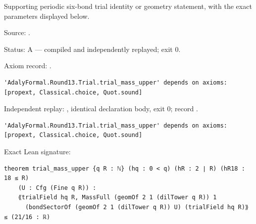\begin{theorem}[bp-372]
\label{bp-372}
\leanok
Supporting periodic six-bond trial identity or geometry statement, with the exact parameters displayed below.

\par Source: \texttt{}.
\par Status: A — compiled and independently replayed; exit 0.
\par Axiom record: \texttt{}.
\begin{verbatim}
'AdalyFormal.Round13.Trial.trial_mass_upper' depends on axioms: [propext, Classical.choice, Quot.sound]
\end{verbatim}
\par Independent replay: \texttt{}, identical declaration body, exit 0; record \texttt{}.
\begin{verbatim}
'AdalyFormal.Round13.Trial.trial_mass_upper' depends on axioms: [propext, Classical.choice, Quot.sound]
\end{verbatim}
\par Exact Lean signature:
\begin{verbatim}
theorem trial_mass_upper {q R : ℕ} (hq : 0 < q) (hR : 2 ∣ R) (hR18 : 18 ≤ R)
    (U : Cfg (Fine q R)) :
    ⟪trialField hq R, MassFull (geomOf 2 1 (dilTower q R)) 1
      (bondSectorOf (geomOf 2 1 (dilTower q R)) U) (trialField hq R)⟫ ≤ (21/16 : ℝ)
\end{verbatim}
\end{theorem}

